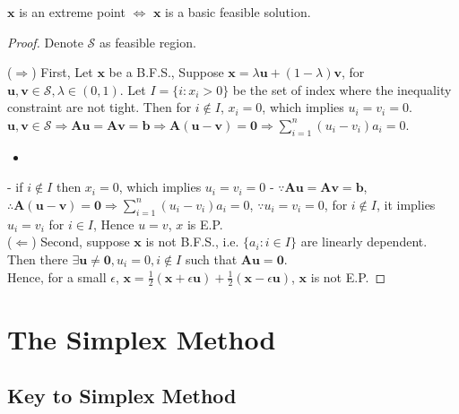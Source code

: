 				\begin{theorem}
					$\mathbf{x}$ is an extreme point $\iff$ $\mathbf{x}$ is a basic feasible solution.
				\end{theorem}

				\begin{proof}
					Denote $\mathcal{S}$ as feasible region. 

					($\Rightarrow$) First, Let $\mathbf{x}$ be a B.F.S., Suppose $\mathbf{x} =\lambda \mathbf{u} + (1 - \lambda) \mathbf{v}$, for $\mathbf{u}, \mathbf{v} \in \mathcal{S}, \lambda \in (0, 1)$. Let $I = \{i: x_i > 0\}$ be the set of index where the inequality constraint are not tight. Then for $i \notin I$, $x_i = 0$, which implies $u_i = v_i = 0$. $\mathbf{u}, \mathbf{v} \in \mathcal{S} \Rightarrow \mathbf{Au} = \mathbf{Av} = \mathbf{b} \Rightarrow \mathbf{A (u - v)} = \mathbf{0} \Rightarrow \sum_{i = 1}^n (u_i - v_i)a_i = 0$.
					\begin{itemize}
						\item 
					\end{itemize}
					- if $i \notin I$ then $x_i = 0$, which implies $u_i = v_i = 0$
					- $\because \mathbf{Au} = \mathbf{Av} = \mathbf{b}$, $\therefore \mathbf{A(u-v)} = \textbf{0} \Rightarrow \sum_{i=1}^n(u_i - v_i)a_i = 0$, $\because u_i = v_i = 0$, for $i\notin I$, it implies $u_i = v_i$ for $i\in I$, Hence $u=v$, $x$ is E.P.\\

					($\Leftarrow$) Second, suppose $\mathbf{x}$ is not B.F.S., i.e. $\{a_i: i \in I\}$ are linearly dependent.\\
					Then there $\exists \mathbf{u}\ne \mathbf{0}, u_i =0 , i\notin I$ such that $\mathbf{Au}=\mathbf{0}$.\\
					Hence, for a small $\epsilon$, $\mathbf{x}=\frac12(\mathbf{x} + \epsilon \mathbf{u}) + \frac12(\mathbf{x} - \epsilon \mathbf{u})$, $\mathbf{x}$ is not E.P.
				\end{proof}

			\section{The Simplex Method}
				\subsection{Key to Simplex Method}
